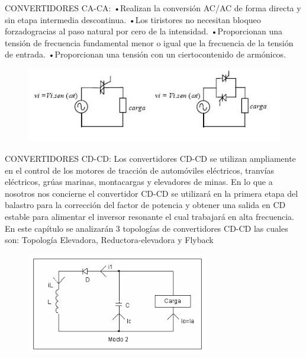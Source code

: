\documentclass[10pt,letterpaper]{article}
\begin{document}
\newpage
CONVERTIDORES CA-CA:
•Realizan  la conversión  AC/AC  de  forma  directa y  sin  etapa  intermedia  descontinua.
•Los tiristores no necesitan bloqueo forzadogracias al paso natural por cero de la intensidad.
•Proporcionan  una  tensión  de frecuencia fundamental menor  o  igual que  la frecuencia de la tensión de entrada.
•Proporcionan una tensión con un ciertocontenido de armónicos.
\begin{figure}[h!]
\centering
\includegraphics[scale=4]{caca}
\end{figure}
\newpage
CONVERTIDORES CD-CD:
Los convertidores CD-CD se utilizan  ampliamente en el control de los motores de tracción de automóviles eléctricos, tranvías eléctricos, grúas marinas, montacargas y elevadores de minas. En lo que a nosotros nos concierne el convertidor CD-CD se utilizará en la primera etapa del balastro  para  la  corrección  del  factor  de  potencia  y  obtener  una  salida  en  CD  estable  para  alimentar  el  inversor  resonante  el  cual  trabajará  en  alta  frecuencia.  En  este  capítulo  se  analizarán  3  topologías  de  convertidores  CD-CD  las  cuales  son:  Topología  Elevadora,  Reductora-elevadora y Flyback
\begin{figure}[h!]
\centering
\includegraphics[scale=.9]{cdcd} 
\end{figure}
\end{document}
